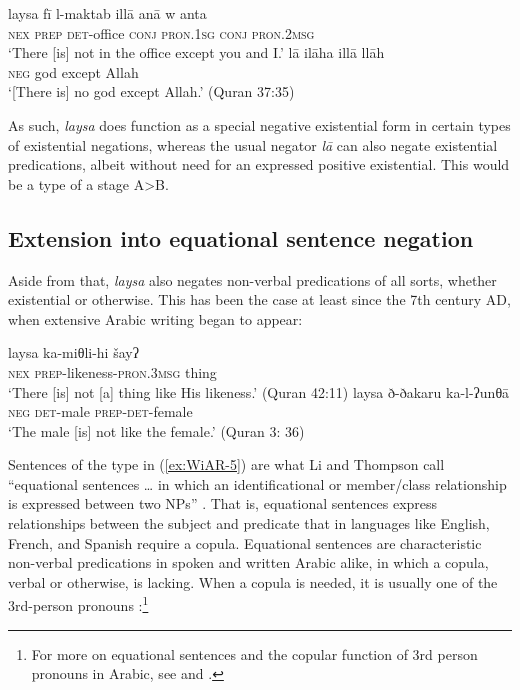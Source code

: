 \documentclass[output=paper]{langsci/langscibook}
\begin{document}
\ea \label{ex:WiAR-4}
  \ea
  	\gll laysa fī l-maktab illā anā w anta\\
  	\textsc{nex} \textsc{prep} \textsc{det}-office \textsc{conj} \textsc{pron.1sg} \textsc{conj} \textsc{pron.2msg}\\
  	\glt ‘There [is] not in the office except you and I.’ \citep[273]{adwan2000a}
  \ex
  	\gll lā ilāha illā llāh\\
  	\textsc{neg} god except Allah\\
  	\glt ‘[There is] no god except Allah.’ (Quran 37:35)
\z \z

As such, \textit{laysa} does function as a special negative existential form in certain types of existential negations, whereas the usual negator \textit{lā} can also negate existential predications, albeit without need for an expressed positive existential. This would be a type of a stage A>B.

\subsection{Extension into equational sentence negation} \label{s:WiAR-2.2}

Aside from that, \textit{laysa} also negates non-verbal predications of all sorts, whether existential or otherwise. This has been the case at least since the 7th century AD, when extensive Arabic writing began to appear:

\ea \label{ex:WiAR-5}
  \ea
  	\gll laysa ka-miθli-hi šayʔ\\
  	\textsc{nex} \textsc{prep}-likeness-\textsc{pron.3msg} thing\\
  	\glt ‘There [is] not [a] thing like His likeness.’ (Quran 42:11)
  \ex
  	\gll laysa ð-ðakaru ka-l-ʔunθā\\
  	\textsc{neg} \textsc{det}-male \textsc{prep-det}-female\\
  	\glt ‘The male [is] not like the female.’ (Quran 3: 36)
\z \z



Sentences of the type in (\ref{ex:WiAR-5}) are what Li and Thompson call “equational sentences … in which an identificational or member/class relationship is expressed between two NPs” \citeyearpar[419]{li1977a}. That is, equational sentences express relationships between the subject and predicate that in languages like English, French, and Spanish require a copula. Equational sentences are characteristic non-verbal predications in spoken and written Arabic alike, in which a copula, verbal or otherwise, is lacking. When a copula is needed, it is usually one of the 3rd-person pronouns \citep[431--433]{li1977a}:\footnote{For more on equational sentences and the copular function of 3rd person pronouns in Arabic, see \citet{eid1983a, eid1991a} and \citet{choueiri2016a}.}
\end{document}
